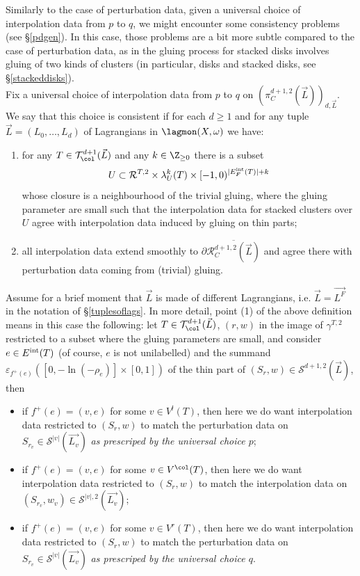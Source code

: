 	Similarly to the case of perturbation data, given a universal choice of interpolation data from $p$ to $q$, we might encounter some consistency problems (see \S \ref{pdgen}). In this case, those problems are a bit more subtle compared to the case of perturbation data, as in the gluing process for stacked disks involves gluing of two kinds of clusters (in particular, disks and stacked disks, see \S \ref{stackeddisks}).\\ Fix a universal choice of interpolation data from $p$ to $q$ on $(\pi^{d+1,2}_C(\vec{L}))_{d,\vec{L}}$. We say that this choice is consistent if for each $d\geq 1$ and for any tuple $\vec{L}=(L_0,\ldots, L_d)$ of Lagrangians in $\lagmon(X,\omega)$ we have:
	\begin{enumerate}
		\item for any $T\in \mathcal{T}^{d+1}_\col(\vec{L})$ and any $k\in \Z_{\geq 0}$ there is a subset $$U\subset \mathcal{R}^{T,2}\times \lambda_U^k(T)\times [-1,0)^{|E^\textnormal{int}_F(T)|+k}$$ whose closure is a neighbourhood of the trivial gluing, where the gluing parameter are small such that the interpolation data for stacked clusters over $U$ agree with interpolation data induced by gluing on thin parts;
		\item all interpolation data extend smoothly to $\partial \overline{\mathcal{R}^{d+1,2}_C(\vec{L})}$ and agree there with perturbation data coming from (trivial) gluing.
	\end{enumerate}
	Assume for a brief moment that $\vec{L}$ is made of different Lagrangians, i.e. $\vec{L}=\vec{L^F}$ in the notation of \S \ref{tuplesoflags}. In more detail, point (1) of the above definition means in this case the following: let $T\in \mathcal{T}^{d+1}_\col(\vec{L})$, $(r,w)$ in the image of $\gamma^{T,2}$ restricted to a subset where the gluing parameters are small, and consider $e\in E^\textnormal{int}(T)$ (of course, $e$ is not unilabelled) and the summand $\varepsilon_{f^+(e)}([0,-\ln(-\rho_e)]\times [0,1])$ of the thin part of $(S_r,w)\in \mathcal{S}^{d+1,2}(\vec{L})$, then \begin{itemize}
		\item if $f^+(e)=(v,e)$ for some $v\in V^l(T)$, then here we do want interpolation data restricted to $(S_r,w)$ to match the perturbation data on $S_{r_v}\in \mathcal{S}^{|v|}(\vec{L_v})$ \textit{as prescriped by the universal choice $p$};
		\item if $f^+(e)=(v,e)$ for some $v\in V^\col(T)$, then here we do want interpolation data restricted to $(S_r,w)$ to match the interpolation data on $(S_{r_v}, w_v)\in \mathcal{S}^{|v|,2}(\vec{L_v})$;
		\item if $f^+(e)=(v,e)$ for some $v\in V^r(T)$, then here we do want interpolation data restricted to $(S_r,w)$ to match the perturbation data on $S_{r_v}\in \mathcal{S}^{|v|}(\vec{L_v})$ \textit{as prescriped by the universal choice $q$}.
	\end{itemize}
